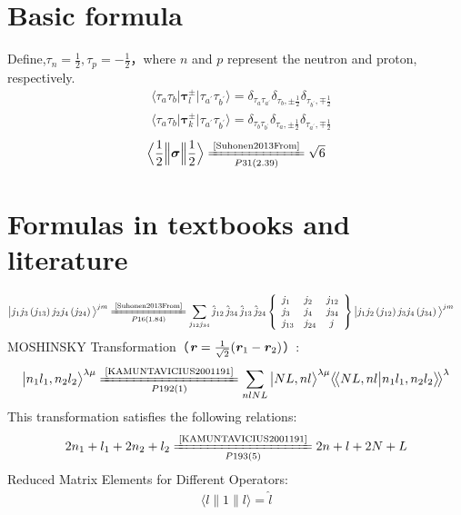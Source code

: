 \documentclass[master]{shnuthesis}
\newcommand{\llangle}{\big\langle\!\big\langle}
\newcommand{\rrangle}{\big\rangle\!\big\rangle}
\newcommand{\bmr}{\textbf{\textit{r}}}
\newcommand{\ap}{a^\prime}
\newcommand{\bp}{b^\prime}
\newcommand{\zdydh}{\xlongequal}
\begin{document}
\section{Basic formula}
Define,$\tau_n=\frac{1}{2},\tau_p=-\frac{1}{2}$，where $n$ and $p$ represent the neutron and proton, respectively.
\begin{align}
    & \big\langle \tau_a\tau_b \big|\bm{\tau}_l^{\pm} \big|\tau_{\ap}\tau_{\bp}\big\rangle  = \delta_{\tau_a \tau_{\ap}} \delta_{\tau_b, \pm\frac{1}{2}} \delta_{\tau_{\bp}, \mp\frac{1}{2}} \label{tau-l}
\end{align}
\begin{align}
    & \big\langle \tau_a\tau_b \big|\bm{\tau}_k^{\pm} \big|\tau_{\ap}\tau_{\bp}\big\rangle  = \delta_{\tau_b \tau_{\bp}} \delta_{\tau_a, \pm\frac{1}{2}} \delta_{\tau_{\ap}, \mp\frac{1}{2}} \label{tau-k}
\end{align}
\begin{align}
    \Big\langle \frac{1}{2}\Big\|\bm{\sigma}\Big\|\frac{1}{2} \Big\rangle \zdydh[P31(2.39)]{\text{\cite{Suhonen2013From}}} \sqrt{6} \label{jzy-sigma}
\end{align}

\section{Formulas in textbooks and literature}
\begin{align}
    & \big|j_{1} j_{3}\left(j_{13}\right) j_{2} j_{4}\left(j_{24}\right) \big\rangle^{j m} \xlongequal[P16(1.84)]{\text{\cite{Suhonen2013From}}} \sum_{j_{12} j_{34}} \hat{j}_{12}\, \hat{j}_{34}\, \hat{j}_{13}\, \hat{j}_{24}  \left\{\begin{array}{lll}j_{1} & j_{2} & j_{12} \\j_{3} & j_{4} & j_{34} \\j_{13} & j_{24} & \,\,j\end{array}\right\}  \big|j_{1} j_{2}\left(j_{12}\right) j_{3} j_{4}\left(j_{34}\right) \big\rangle^{jm} \label{1324}
\end{align}
MOSHINSKY Transformation（$\bmr=\frac{1}{\sqrt{2}}(\bmr_1-\bmr_2)$）:
\begin{align}
    \big|n_{1} l_{1}, n_{2} l_{2}\big\rangle^{\lambda \mu} \xlongequal[P192(1)]{\text{\cite{KAMUNTAVICIUS2001191}}} \sum_{n l N L} \big|N L, n l \big\rangle^{\lambda \mu} \llangle N L, n l \big| n_{1} l_{1}, n_{2} l_{2} \rrangle^{\lambda} \label{MOSHINSKY}
\end{align}
This transformation satisfies the following relations:
\begin{align}
    2 n_{1}+l_{1}+2 n_{2}+l_{2} \zdydh[P193(5)]{\text{\cite{KAMUNTAVICIUS2001191}}} 2 n+l+2 N+L \label{MOSHINSKY-1}
\end{align}
Reduced Matrix Elements for Different Operators:
\begin{align}
    \langle l \|1\| l \rangle = \hat{l} \label{jzy-1}
\end{align}
\end{document}
